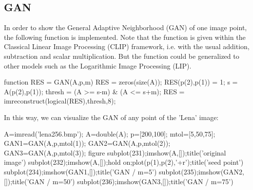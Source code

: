 \def\QRCODE{MASTER_mispa_TUT.IMG.ganip_matlabqrcode.png}
\def\QRPAGE{http://www.iptutorials.science/tree/master/MASTER_mispa/TUT.IMG.ganip/matlab}

\subsection{GAN}
In order to show the General Adaptive Neighborhood (GAN) of one image point, the following function is implemented.
Note that the function is given within the Classical Linear Image Processing (CLIP) framework, i.e. with the usual addition, subtraction and scalar multiplication. But the function could be generalized to other models such as the Logarithmic Image Processing (LIP).

\begin{matlab}
function RES = GAN(A,p,m)
RES = zeros(size(A));
RES(p(2),p(1)) = 1;
s = A(p(2),p(1));
thresh = (A >= s-m) & (A <= s+m);
RES = imreconstruct(logical(RES),thresh,8);
\end{matlab}

\noindent In this way, we can visualize the GAN of any point of the 'Lena' image: 
\begin{matlab}
A=imread('lena256.bmp');
A=double(A);
p=[200,100];
mtol=[5,50,75];
GAN1=GAN(A,p,mtol(1));
GAN2=GAN(A,p,mtol(2));
GAN3=GAN(A,p,mtol(3));
figure
subplot(231);imshow(A,[]);title('original image')
subplot(232);imshow(A,[]);hold on;plot(p(1),p(2),'+r');title('seed point')
subplot(234);imshow(GAN1,[]);title('GAN / m=5')
subplot(235);imshow(GAN2,[]);title('GAN / m=50')
subplot(236);imshow(GAN3,[]);title('GAN / m=75')
\end{matlab}

